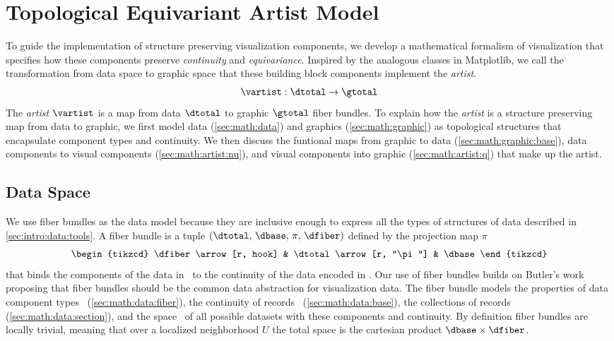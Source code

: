 \documentclass[../main.tex]{subfiles}
\begin{document}
\section{Topological Equivariant Artist Model}
\label{sec:math}
To guide the implementation of structure preserving visualization components, we develop a mathematical formalism of visualization that specifies how these components preserve \textit{continuity} and \textit{equivariance}. Inspired by the analogous classes in Matplotlib\cite{hunterArchitectureOpenSource}, we call the transformation from data space to graphic space that these building block components implement the \textit{artist}.
\begin{equation}
    \label{eq:artist}
    \mathscr{\vartist}: \mathscr{\dtotal} \rightarrow \mathscr{\gtotal}
\end{equation}
The \textit{artist} $\mathscr{\vartist}$ is a map from data $\mathscr{\dtotal}$ to graphic $\mathscr{\gtotal}$ fiber bundles. To explain how the \textit{artist} is a structure preserving map from data to graphic, we first model data (\autoref{sec:math:data}) and graphics (\autoref{sec:math:graphic}) as topological structures that encapsulate component types and continuity. We then discuss the funtional maps from graphic to data (\autoref{sec:math:graphic:base}), data components to visual components (\autoref{sec:math:artist:nu}), and visual components into graphic (\autoref{sec:math:artist:q}) that make up the artist.

\subsection{Data Space \dtotal}
\label{sec:math:data}
We use fiber bundles as the data model because they are inclusive enough to express all the types of structures of data described in \autoref{sec:intro:data:tools}. A fiber bundle is a tuple $(\dtotal,\,\dbase,\,\pi ,\,\dfiber)$ defined by the projection map $\pi$
\begin{equation}
    \label{eq:fiber_bundle}
    \begin{tikzcd}
        \dfiber \arrow[r, hook] & \dtotal \arrow[r, "\pi"] & \dbase
    \end{tikzcd}
\end{equation}
that binds the components of the data in \dfiber\ to the continuity of the data encoded in \dbase. Our use of fiber bundles builds on Butler's work proposing that fiber bundles should be the common data abstraction for visualization data\cite{butlerVectorBundleClassesForm1992, butlerVisualizationModelBased1989}. The fiber bundle models the properties of data component types \dfiber\ (\autoref{sec:math:data:fiber}), the continuity of records \dbase\ (\autoref{sec:math:data:base}), the collections of records (\autoref{sec:math:data:section}), and the space \dtotal\ of all possible datasets with these components and continuity. By definition fiber bundles are locally trivial\cite{spanier1989algebraic,LocallyTrivialFibre}, meaning that over a localized neighborhood $U$ the total space is the cartesian product $\dbase\times\dfiber$. 
\end{document}
